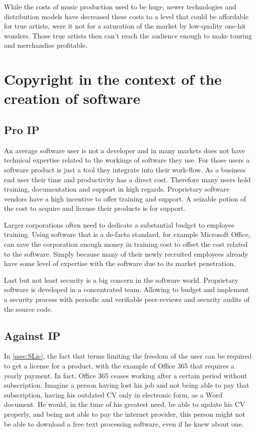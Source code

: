 \documentclass[a4paper]{report}
\begin{document}
While the costs of music production used to be huge, newer technologies and distribution models have decreased these costs to a level that could be affordable for true artists, were it not for a saturation of the market by low-quality one-hit wonders. Those true artists then can't reach the audience enough to make touring and merchandise profitable.

\section{Copyright in the context of the creation of software}
\label{sec:CopySoft}

\subsection{Pro IP}
An average software user is not a developer and in many markets does not have technical expertise related to the workings of software they use. For those users a software product is just a tool they integrate into their work-flow. As a business end user their time and productivity has a direct cost. Therefore many users hold training, documentation and support in high regards. Proprietary software vendors have a high incentive to offer training and support. A seizable potion of the cost to acquire and license their products is for support. 

Larger corporations often need to dedicate a substantial budget to employee training. Using software that is a de-facto standard, for example Microsoft Office, can save the corporation enough money in training cost to offset the cost related to the software. Simply because many of their newly recruited employees already have some level of expertise with the software due to its market penetration.

Last but not least security is a big concern in the software world. Proprietary software is developed in a concentrated team. Allowing to budget and implement a security process with periodic and verifiable peer-reviews and security audits of the source code. 

\subsection{Against IP}
In \ref{ssec:SLic}, the fact that terms limiting the freedom of the user can be required to get a license for a product, with the example of Office 365 that requires a yearly payment. In fact, Office 365 ceases working after a certain period without subscription. Imagine a person having lost his job and not being able to pay that subscription, having his outdated CV only in electronic form, as a Word document. He would, in the time of his greatest need, be able to update his CV properly, and being not able to pay the internet provider, this person might not be able to download a free text processing software, even if he knew about one. 
\end{document}
